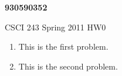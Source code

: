 \documentclass{article}
\begin{document}
\begin{center}
{\bf 930590352}

CSCI 243 Spring 2011 HW0
\end{center}
\begin{enumerate}
\item This is the first problem.
\item This is the second problem.
\end{enumerate}
\end{document}
